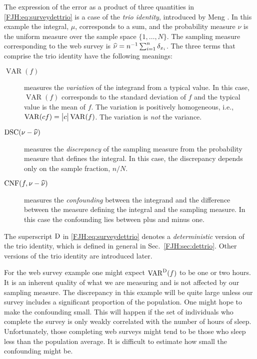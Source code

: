 \documentclass[graybox,footinfo]{svmult}
\DeclareMathOperator{\algn}{CNF}
\DeclareMathOperator{\disc}{DSC}
\DeclareMathOperator{\Var}{VAR}
\begin{document}
The expression of the error as a product of three quantities in 
\eqref{FJH:eq:surveydettrio} is a case of the \emph{trio identity}, introduced by Meng 
\cite{Men16a}.  In this example the integral, $\mu$, corresponds to a sum, 
and the probability measure $\nu$ is the uniform measure over the sample space $\{1, 
\ldots, N\}$.  The sampling measure corresponding to the web survey is $\widehat{\nu} = 
n^{-1} \sum_{i=1}^n \delta_{x_i}$.  The three terms that comprise the trio identity have the 
following meanings:
\begin{description}
	\item[$\Var(f)$] measures the \emph{variation} of the integrand from a typical value. 
	In 	this case, $\Var(f)$ corresponds to the standard deviation of $f$ and the typical 
	value	is the mean of $f$. The variation is positively homogeneous, i.e., $\Var(cf)  = 
	\abs{c} \Var(f)$.  The variation is \emph{not} the variance.
	\item [$\disc(\nu - \hnu)$] measures the \emph{discrepancy} of the sampling 
	measure 
	from the probability measure that defines the integral.  In this case, the discrepancy 
	depends only on the sample fraction, $n/N$.
	\item [$\algn(f,\nu - \hnu)$] measures the \emph{confounding} between the 
	integrand and the difference between the measure defining the integral and the 
	sampling measure.  In this case the confounding lies between plus and minus one.
\end{description}
The superscript $\textup{D}$ in \eqref{FJH:eq:surveydettrio} denotes a \emph{deterministic} 
version of the trio identity, which is defined in general in Sec.\ \ref{FJH:sec:dettrio}. 
Other versions of the trio identity are introduced later.

\begin{FJHLesson}
	\FJHLessonZero
\end{FJHLesson}

For the web survey example one might expect $\Var^\Dt(f)$ to be one or two hours.  It 
is an inherent quality of what we are measuring and is not affected by our sampling 
measure.  The discrepancy in this example will be quite large unless our survey includes a 
significant proportion of the population.  One might hope to make  the confounding 
small.  This will happen if the set of individuals who complete the survey 
is only weakly correlated with the number of hours of sleep.  Unfortunately, those  
completing web surveys might tend to be those who sleep less than the 
population average.  It is difficult to estimate how small the confounding might be.  
\end{document}
